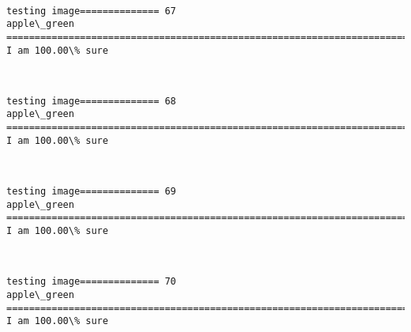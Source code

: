 \documentclass[11pt]{article}
\begin{document}
    \begin{center}
    \end{center}
    { \hspace*{\fill} \\}
    
    \begin{Verbatim}[commandchars=\\\{\}]
testing image============== 67
apple\_green
============================================================================
I am 100.00\% sure

    \end{Verbatim}

    \begin{center}
    \end{center}
    { \hspace*{\fill} \\}
    
    \begin{Verbatim}[commandchars=\\\{\}]
testing image============== 68
apple\_green
============================================================================
I am 100.00\% sure

    \end{Verbatim}

    \begin{center}
    \end{center}
    { \hspace*{\fill} \\}
    
    \begin{Verbatim}[commandchars=\\\{\}]
testing image============== 69
apple\_green
============================================================================
I am 100.00\% sure

    \end{Verbatim}

    \begin{center}
    \end{center}
    { \hspace*{\fill} \\}
    
    \begin{Verbatim}[commandchars=\\\{\}]
testing image============== 70
apple\_green
============================================================================
I am 100.00\% sure

    \end{Verbatim}
\end{document}
